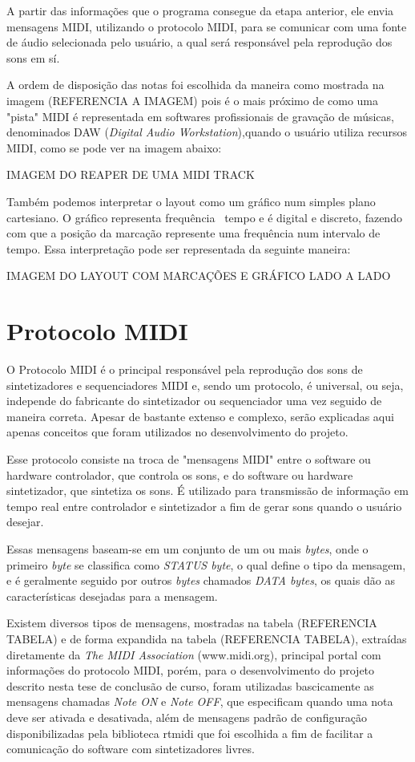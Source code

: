 \documentclass[12pt]{report}
\begin{document}
A partir das informações que o programa consegue da etapa anterior, ele envia mensagens MIDI, utilizando o protocolo MIDI, para se comunicar com uma fonte de áudio selecionada pelo usuário, a qual será responsável pela reprodução dos sons em sí.

A ordem de disposição das notas foi escolhida da maneira como mostrada na imagem (REFERENCIA A IMAGEM) pois é o mais próximo de como uma "pista" MIDI é representada em softwares profissionais de gravação de músicas, denominados DAW ({\it Digital Audio Workstation}),quando o usuário utiliza recursos MIDI, como se pode ver na imagem abaixo:

IMAGEM DO REAPER DE UMA MIDI TRACK

Também podemos interpretar o layout como um gráfico num simples plano cartesiano. O gráfico representa frequência \times\ tempo e é digital e discreto, fazendo com que a posição da marcação represente uma frequência num intervalo de tempo. Essa interpretação pode ser representada da seguinte maneira:

IMAGEM DO LAYOUT COM MARCAÇÕES E GRÁFICO LADO A LADO

\section{Protocolo MIDI}

O Protocolo MIDI é o principal responsável pela reprodução dos sons de sintetizadores e sequenciadores MIDI e, sendo um protocolo, é universal, ou seja, independe do fabricante do sintetizador ou sequenciador uma vez seguido de maneira correta. Apesar de bastante extenso e complexo, serão explicadas aqui apenas conceitos que foram utilizados no desenvolvimento do projeto.

Esse protocolo consiste na troca de "mensagens MIDI" entre o software ou hardware controlador, que controla os sons, e do software ou hardware sintetizador, que sintetiza os sons. É utilizado para transmissão de informação em tempo real entre controlador e sintetizador a fim de gerar sons quando o usuário desejar.

Essas mensagens baseam-se em um conjunto de um ou mais {\it bytes}, onde o primeiro {\it byte} se classifica como {\it STATUS byte}, o qual define o tipo da mensagem, e é geralmente seguido por outros {\it bytes} chamados {\it DATA bytes}, os quais dão as características desejadas para a mensagem.

Existem diversos tipos de mensagens, mostradas na tabela (REFERENCIA TABELA) e de forma expandida na tabela (REFERENCIA TABELA), extraídas diretamente da {\it The MIDI Association} (www.midi.org), principal portal com informações do protocolo MIDI, porém, para o desenvolvimento do projeto descrito nesta tese de conclusão de curso, foram utilizadas bascicamente as mensagens chamadas {\it Note ON} e {\it Note OFF}, que especificam quando uma nota deve ser ativada e desativada, além de mensagens padrão de configuração disponibilizadas pela biblioteca rtmidi que foi escolhida a fim de facilitar a comunicação do software com sintetizadores livres.
\end{document}
